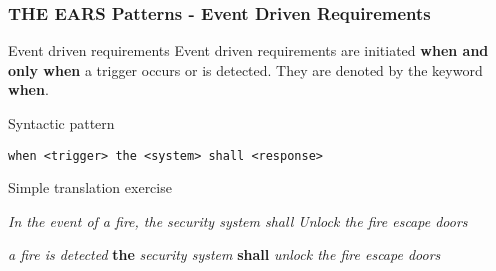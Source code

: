 \documentclass[aspectratio=169]{beamer}
\newcommand{\earse}[3]{{\bf \color{mygreen}when} {#1} {\bf \color{mypurple}the} {#2} {\bf \color{mypurple}shall} {#3}}
\begin{document}
%
%
%
\begin{frame}[fragile]
 \frametitle{THE EARS Patterns - Event Driven Requirements}
 \begin{block}{Event driven requirements}
  Event driven requirements are initiated {\bf when and only when} a trigger occurs or is detected. They are denoted  by the keyword {\bf \color{mygreen} when}.
 \end{block}
 \begin{block}{Syntactic pattern}
  \begin{lstlisting}[language=EARS]
             when <trigger> the <system> shall <response>
  \end{lstlisting}
 \end{block}
  \pause
   \begin{block}{Simple translation exercise}
   \begin{description}
   \pause
     \item [Original req:] \textit{In the event of a fire, the security system shall Unlock the fire escape doors}
     \item [In EARS:] \pause \earse{\textit{a fire is detected}}{\textit{security system}}{\textit{unlock the fire escape doors}}
   \end{description}
   \end{block}
\end{frame}  
\end{document}
